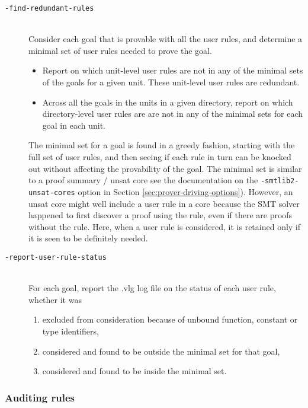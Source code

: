 \documentclass[12pt,fleqn]{article}
\newcommand{\optionb}[1]{\item[\texttt{-{#1}}]\ \\}
\begin{document}
\begin{description}
  \optionb{find-redundant-rules} Consider each goal that is provable
  with all the user rules, and determine a minimal set of user rules
  needed to prove the goal.
    \begin{itemize}
    \item Report on which unit-level user rules are not in any of the
      minimal sets of the goals for a given unit.
      These unit-level user rules are redundant.
    \item Across all the goals in the units in a given directory, report 
      on which directory-level user rules are
      are not in any of the minimal sets for each goal in each unit.
    \end{itemize}
    The minimal set for a goal is found in a greedy fashion, starting
    with the full set of user rules, and then seeing if each rule in
    turn can be knocked out without affecting the provability of the
    goal.
    The minimal set is similar to a proof summary / unsat core 
     see the documentation on the \texttt{-smtlib2-unsat-cores} option in 
    Section \ref{sec:prover-driving-options}).
    However, an unsat core might well include a user rule in a core because
    the SMT solver happened to first discover a proof using the rule, even if
    there are proofs without the rule.
    Here, when a user rule is considered, it is retained only if it is seen
    to be definitely needed.

\optionb{report-user-rule-status}
  For each goal, report the .vlg log file on the status of each user
  rule, whether it was
  \begin{enumerate}
  \item excluded from consideration because of unbound function,
    constant or type identifiers,
  \item considered and found to be outside the minimal set for that goal,
  \item considered and found to be inside the minimal set.
  \end{enumerate}

  
\end{description}
\subsubsection{Auditing rules}
\end{document}
